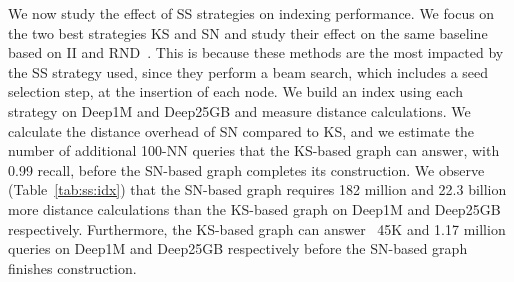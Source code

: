 We now study the effect of SS strategies on indexing performance. We focus on the two best strategies KS and SN and study their effect on the same baseline based on II and RND~\cite{nsw11,dpg,hnsw,nsg,nssg,vamana,elpis,SPTAG4}. This is because these methods are the most impacted by the SS strategy used, since they perform a beam search, which includes a seed selection step, at the insertion of each node.
We build an index using each strategy on Deep1M and Deep25GB and measure distance calculations. %
We calculate the distance overhead of SN compared to KS, and we estimate the number of additional 100-NN queries that the KS-based graph can answer, with 0.99 recall, before the SN-based graph completes its construction.  
We observe (Table~\ref{tab:ss:idx}) that the SN-based graph requires 182 million and 22.3 billion more distance calculations than the KS-based graph on Deep1M and Deep25GB respectively. Furthermore, the KS-based graph can answer ~45K and 1.17 million queries on Deep1M and Deep25GB respectively before the SN-based graph finishes construction.

